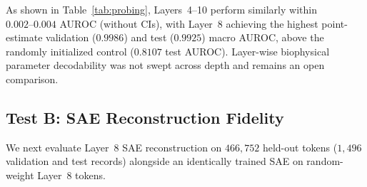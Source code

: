\documentclass[10pt,twocolumn,letterpaper]{article}
\begin{document}
\begin{table}[h]
\centering
\caption{\textbf{Test A: Diagnostic Probing Across Depth.} Validation and test macro AUROC and test accuracy (\%) on 8-class pathology classification. Random Control reports the 3-seed validation mean and Seed~0 test evaluation.}
\label{tab:probing}
\vspace{2pt}
\end{table}

As shown in Table~\ref{tab:probing}, Layers~4--10 perform similarly within $0.002\text{--}0.004$ AUROC (without CIs), with Layer~8 achieving the highest point-estimate validation ($0.9986$) and test ($0.9925$) macro AUROC, above the randomly initialized control ($0.8107$ test AUROC). Layer-wise biophysical parameter decodability was not swept across depth and remains an open comparison.

\subsection{Test B: SAE Reconstruction Fidelity}
We next evaluate Layer~8 SAE reconstruction on $466{,}752$ held-out tokens ($1{,}496$ validation and test records) alongside an identically trained SAE on random-weight Layer~8 tokens.

\begin{table}[h]
\centering
\caption{\textbf{Test B: SAE Fidelity and Information Preservation.} Held-out per-token EV (\%), global sequence EV (\%), dead atom rate (\%), and downstream test macro AUROC for probes fit on a 3,000-record stratified training subsample.}
\label{tab:fidelity}
\vspace{2pt}
\end{table}
\end{document}
